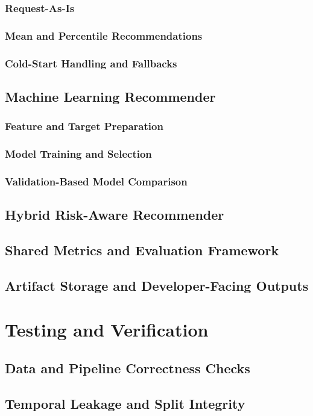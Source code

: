 \documentclass{IEEEtran}
\begin{document}
\subsubsection{Request-As-Is}
\subsubsection{Mean and Percentile Recommendations}
\subsubsection{Cold-Start Handling and Fallbacks}
\subsection{Machine Learning Recommender}
\subsubsection{Feature and Target Preparation}
\subsubsection{Model Training and Selection}
\subsubsection{Validation-Based Model Comparison}
\subsection{Hybrid Risk-Aware Recommender}
\subsection{Shared Metrics and Evaluation Framework}
\subsection{Artifact Storage and Developer-Facing Outputs}
\section{Testing and Verification}
\subsection{Data and Pipeline Correctness Checks}
\subsection{Temporal Leakage and Split Integrity}
\end{document}
